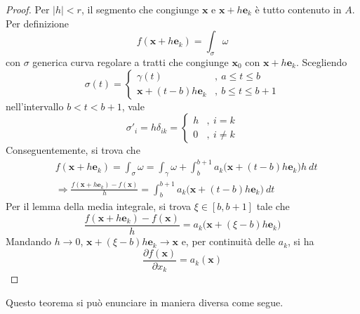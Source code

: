 \documentclass[10pt, a4paper]{scrartcl}
\theoremstyle{definition}
\numberwithin{esempio}{section}
\theoremstyle{definition}
\numberwithin{obs}{section}
\numberwithin{nota}{section}
\numberwithin{equation}{subsection}
\begin{document}
\begin{teorema}
\begin{proof}
		Per $\lvert h \rvert < r$, il segmento che congiunge $\mathbf{x}$ e $ \mathbf{x} + h\mathbf{e} _k$ \`e tutto contenuto in $A$.
		Per definizione
		\[
		f(\mathbf{x} +h\mathbf{e} _k) = \int_{\sigma } \omega
		\] 
	con $\sigma $ generica curva regolare a tratti che congiunge $\mathbf{x} _0$ con $\mathbf{x} +h\mathbf{e} _k$.
	Scegliendo 
	\[
	\sigma (t) = \begin{cases}
		\gamma(t) &,\ a\le t\le b\\
		\mathbf{x} + (t-b)h \mathbf{e} _k &,\ b\le t\le b+1
	\end{cases}
	\] 
	nell'intervallo $b<t<b+1$, vale
	\[
	\sigma '_i = h \delta _{ik} = \begin{cases}
		h &,\ i = k\\
		0 &,\ i\neq k
	\end{cases}
	\] 
	Conseguentemente, si trova che
	\[
		\begin{split}
			&f(\mathbf{x} +h \mathbf{e} _k) = \int_{\sigma } \omega = \int_{\gamma} \omega + \int_{b} ^{b+1} a_k \big(\mathbf{x} +(t-b) h\mathbf{e} _k\big) h \ dt\\
			&\Rightarrow \frac{f(\mathbf{x} +h\mathbf{e} _k) - f(\mathbf{x} )}{h} = \int_{b} ^{b+1} a_k \big(\mathbf{x} +(t-b)h \mathbf{e} _k\big) \ dt
		\end{split}
	\] 
	Per il lemma della media integrale, si trova $\xi \in \left[ b,b+1 \right] $ tale che
	\[
		 \frac{f(\mathbf{x} +h\mathbf{e} _k) - f(\mathbf{x} )}{h} =  a_k \big(\mathbf{x} +(\xi -b)h \mathbf{e} _k\big) 
	\] 
	Mandando $h\to  0$, $\mathbf{x} + (\xi -b) h \mathbf{e} _k \to \mathbf{x} $ e, per continuit\`a delle $a_k$, si ha
	\[
	\frac{\partial f(\mathbf{x} )}{\partial x_k} = a_k(\mathbf{x} )
	\] 
	\end{proof}
\end{teorema}
\noindent Questo teorema si pu\`o enunciare in maniera diversa come segue.
\end{document}
